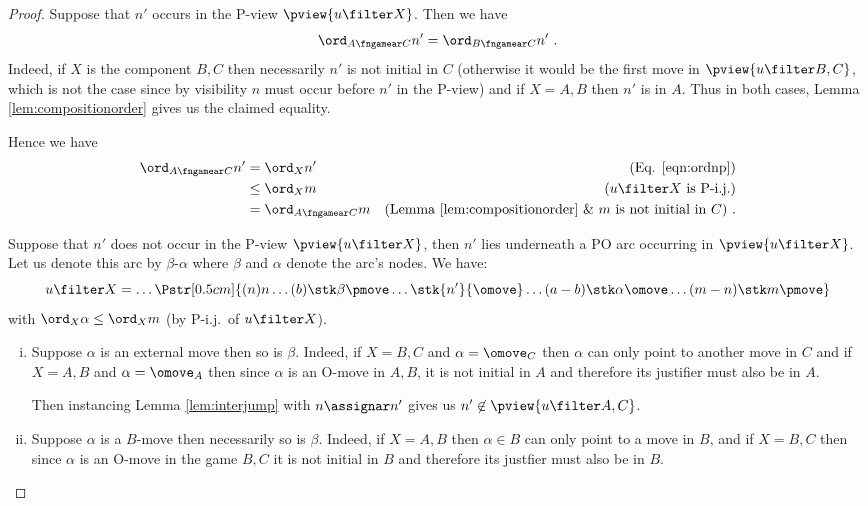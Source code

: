 \begin{proof}

Suppose that $n'$ occurs in the P-view $\pview{u\filter X}$. Then we have
\begin{equation}
\ord_{A\fngamear C} n'  = \ord_{B\fngamear C} n' \ . \label{eqn:ordnp}
\end{equation}
Indeed, if $X$ is the component $B,C$ then necessarily $n'$ is not initial in $C$ (otherwise it would be the first move in $\pview{u \filter B,C}$, which is not the case since by visibility $n$ must occur before $n'$ in the P-view) and
if $X=A,B$ then $n'$ is in $A$. Thus in both cases, Lemma \ref{lem:compositionorder} gives us the claimed equality.

Hence we have
\begin{align*}
\ord_{A\fngamear C} n'
& = \ord_{X} n' & \mbox{(Eq.
\ref{eqn:ordnp})} \\
& \leq \ord_{X} m & \mbox{($u\filter X$ is P-i.j.)} \\
& = \ord_{A\fngamear C} m & \mbox{(Lemma \ref{lem:compositionorder} \& $m$ is not initial in $C$)} \ .
\end{align*}

Suppose that $n'$ does not occur in the P-view $\pview{u \filter X}$, then $n'$ lies underneath a PO arc occurring in $\pview{u \filter X}$. Let us denote this arc by $\beta$-$\alpha$ where $\beta$ and $\alpha$ denote the arc's nodes. We have:
$$ u \filter X = \ldots
\Pstr[0.5cm]{
 (n){n} \ldots (b){\stk\beta \pmove} \ldots \stk{n'} {\omove}
\ldots (a-b){\stk\alpha \omove}  \ldots (m-n){\stk m {\pmove} }
} $$
with $\ord_X \alpha \leq \ord_X m$ (by P-i.j.\ of $u \filter X$).

\begin{enumerate}[i.]
\item Suppose $\alpha$ is an external move then so is $\beta$. Indeed, if $X=B,C$ and $\alpha = \omove_C$ then $\alpha$ can only point to another move in $C$ and
if $X=A,B$ and $\alpha = \omove_A$ then since $\alpha$ is an O-move in $A,B$, it is not initial in $A$ and therefore its justifier must also be in $A$.

Then instancing Lemma \ref{lem:interjump} with
$n \assignar n'$ gives us $n' \not\in\pview{u \filter A,C}$.

\item Suppose $\alpha$ is a $B$-move then necessarily so is $\beta$. Indeed, if $X=A,B$ then $\alpha \in B$
can only point to a move in $B$, and if $X=B,C$ then
since $\alpha$ is an O-move in the game $B,C$ it is not initial in $B$ and therefore its justfier must also be in $B$.


\end{enumerate}
\end{proof}
